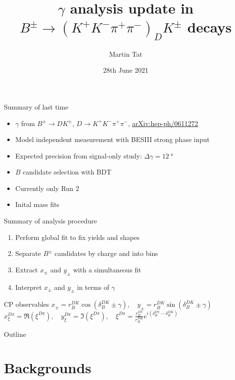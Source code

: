 \documentclass{beamer}
\title[$B^\pm\to(K^+K^-\pi^+\pi^-)_DK^\pm$]{\texorpdfstring{$\gamma$}{gamma} analysis update in \texorpdfstring{$B^\pm\to(K^+K^-\pi^+\pi^-)_DK^\pm$}{B to K+K-pi+pi-} decays}
\author{Martin Tat}
\institute{Oxford LHCb}
\date{28th June 2021}
\begin{document}
\begin{frame}
  \titlepage
\end{frame}

\begin{frame}{Summary of last time}
  \begin{itemize}
    \setlength\itemsep{1.5em}
    \item{$\gamma$ from $B^\pm\to DK^\pm$, $D\to K^+K^-\pi^+\pi^-$, \href{https://arxiv.org/abs/hep-ph/0611272}{arXiv:hep-ph/0611272}}
    \item{Model independent measurement with BESIII strong phase input}
    \item{Expected precision from signal-only study: $\Delta\gamma = \SI{12}{\degree}$}
    \item{$B$ candidate selection with BDT}
    \item{Currently only Run $2$}
    \item{Inital mass fits}
  \end{itemize}
\end{frame}

\begin{frame}{Summary of analysis procedure}
  \begin{enumerate}
    \setlength\itemsep{1.5em}
      \item{Perform global fit to fix yields and shapes}
      \item{Separate $B^\pm$ candidates by charge and into bins}
      \item{Extract $x_\pm$ and $y_\pm$ with a simultaneous fit}
      \item{Interpret $x_\pm$ and $y_\pm$ in terms of $\gamma$}
  \end{enumerate}
  \begin{block}{CP observables}
    $x_\pm = r_B^{DK}\cos(\delta_B^{DK}\pm\gamma), \quad y_\pm = r_B^{DK}\sin(\delta_B^{DK}\pm\gamma)$ \\
    $x_\xi^{D\pi} = \Re(\xi^{D\pi}), \quad y_\xi^{D\pi} = \Im(\xi^{D\pi}), \quad \xi^{D\pi} = \frac{r_B^{D\pi}}{r_B^{DK}}e^{i(\delta_B^{D\pi} - \delta_B^{DK})}$
  \end{block}
\end{frame}

\begin{frame}{Outline}
  \tableofcontents
\end{frame}

\section{Backgrounds}
\end{document}
